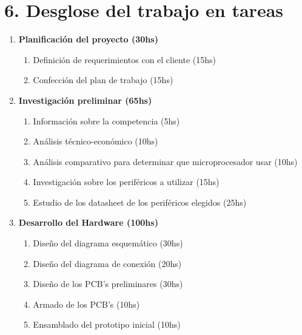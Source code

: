 \documentclass[11pt]{charter}
\begin{document}
\section{6. Desglose del trabajo en tareas}
\label{sec:wbs}

\begin{enumerate}
	\item \textbf{Planificación del proyecto (30hs)}
	\begin{enumerate}[label*=\arabic*.]
		\item Definición de requerimientos con el cliente (15hs)
		\item Confección del plan de trabajo (15hs)
	\end{enumerate}

	\item \textbf{Investigación preliminar (65hs)}
	\begin{enumerate}[label*=\arabic*.]
		\item Información sobre la competencia (5hs)
		\item Análisis técnico-económico (10hs)
		\item Análisis comparativo para determinar que microprocesador usar (10hs)	
		\item Investigación sobre los periféricos a utilizar (15hs)
		\item Estudio de los datasheet de los periféricos elegidos (25hs)   
	\end{enumerate}

	\item \textbf{Desarrollo del Hardware (100hs)}
	\begin{enumerate}[label*=\arabic*.]
		\item Diseño del diagrama esquemático (30hs)
		\item Diseño del diagrama de conexión (20hs)
		\item Diseño de los PCB's preliminares (30hs)	
		\item Armado de los PCB's  (10hs)
		\item Ensamblado del prototipo inicial (10hs)   
	\end{enumerate}
	

\end{enumerate}
\end{document}
